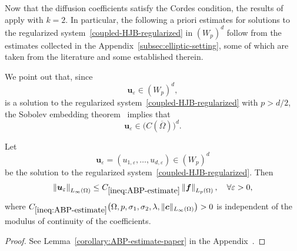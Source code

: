 \documentclass[final,onefignum,onetabnum]{mousaviart}
\begin{document}
	{\color{red} Now that the diffusion coefficients satisfy the Cordes condition, the results of \cite{kuo2007new} apply with \(k=2\). In particular, the following a priori estimates for solutions to the regularized system~\eqref{coupled-HJB-regularized} in \((W_p)^d\) follow from the estimates collected in the Appendix~\ref{subsec:elliptic-setting}, some of which are taken from the literature and some established therein.}
	\begin{remark}
		We point out that, since 
		\[
		\boldsymbol{u}_{\varepsilon} \in (W_p)^d,
		\]
		is a solution to the regularized system~\eqref{coupled-HJB-regularized} with \(p > d/2\), the Sobolev embedding theorem~\cite[Section 5.6.3, Theorem 6]{evans2010partial} implies that
		\[
		\boldsymbol{u}_{\varepsilon} \in \bigl(C(\overline{\Omega})\bigr)^d.
		\]
	\end{remark}
	\begin{lemma}
		\label{rem:ABP-estimate}
		Let 
		\[
		\boldsymbol{u}_{\varepsilon} = \left( u_{1,\varepsilon}, \dots, u_{d,\varepsilon} \right) \in (W_p)^d
		\]
		be the solution to the regularized system~\eqref{coupled-HJB-regularized}. Then
		\begin{equation}
			\label{ineq:ABP-estimate}
			\left\| \boldsymbol{u}_{\varepsilon} \right\|_{L_{\infty}(\Omega)}
			\le 
			C_{\ref{ineq:ABP-estimate}}
			\left\| \boldsymbol{f} \right\|_{L_p(\Omega)},
			\quad \forall \varepsilon > 0,
		\end{equation}
		where $C_{\ref{ineq:ABP-estimate}}\bigl(\Omega, p, \sigma_1, \sigma_2, \lambda, \|\boldsymbol{c}\|_{L_{\infty}(\Omega)} \bigr)>0$ is independent of the modulus of continuity of the coefficients.
	\end{lemma}
	\begin{proof}
		See Lemma~\ref{corollary:ABP-estimate-paper} in the Appendix~{}.
	\end{proof}
\end{document}
